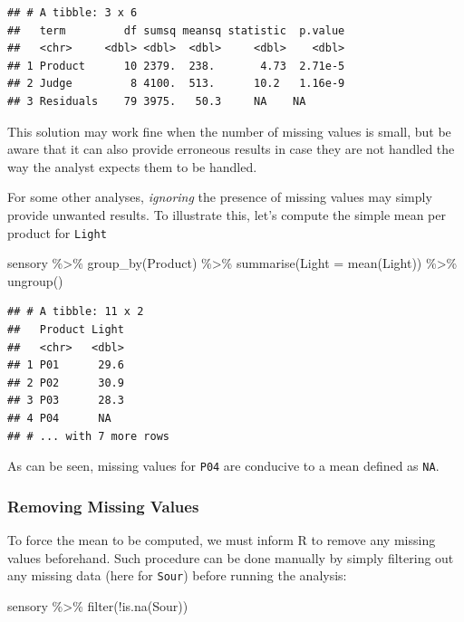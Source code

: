 \documentclass[
]{krantz}
\makeatletter
\newenvironment{Shaded}{\begin{snugshade}}{\end{snugshade}}
\newcommand{\AttributeTok}[1]{\textcolor[rgb]{0.61,0.61,0.61}{#1}}
\newcommand{\FunctionTok}[1]{\textcolor[rgb]{0,0,0}{#1}}
\newcommand{\NormalTok}[1]{#1}
\newcommand{\SpecialCharTok}[1]{\textcolor[rgb]{0,0,0}{#1}}
\newenvironment{kframe}{%
\medskip{}
\setlength{\fboxsep}{.8em}
 \def\at@end@of@kframe{}%
 \ifinner\ifhmode%
  \def\at@end@of@kframe{\end{minipage}}%
  \begin{minipage}{\columnwidth}%
 \fi\fi%
 \def\FrameCommand##1{\hskip\@totalleftmargin \hskip-\fboxsep
 \colorbox{shadecolor}{##1}\hskip-\fboxsep
     \hskip-\linewidth \hskip-\@totalleftmargin \hskip\columnwidth}%
 \MakeFramed {\advance\hsize-\width
   \@totalleftmargin\z@ \linewidth\hsize
   \@setminipage}}%
 {\par\unskip\endMakeFramed%
 \at@end@of@kframe}
\renewenvironment{Shaded}{\begin{kframe}}{\end{kframe}}
\makeatother
\begin{document}
\begin{verbatim}
## # A tibble: 3 x 6
##   term         df sumsq meansq statistic  p.value
##   <chr>     <dbl> <dbl>  <dbl>     <dbl>    <dbl>
## 1 Product      10 2379.  238.       4.73  2.71e-5
## 2 Judge         8 4100.  513.      10.2   1.16e-9
## 3 Residuals    79 3975.   50.3     NA    NA
\end{verbatim}

This solution may work fine when the number of missing values is small, but be aware that it can also provide erroneous results in case they are not handled the way the analyst expects them to be handled.

For some other analyses, \emph{ignoring} the presence of missing values may simply provide unwanted results. To illustrate this, let's compute the simple mean per product for \texttt{Light}

\begin{Shaded}
\begin{Highlighting}[]
\NormalTok{sensory }\SpecialCharTok{\%\textgreater{}\%} 
  \FunctionTok{group\_by}\NormalTok{(Product) }\SpecialCharTok{\%\textgreater{}\%} 
  \FunctionTok{summarise}\NormalTok{(}\AttributeTok{Light =} \FunctionTok{mean}\NormalTok{(Light)) }\SpecialCharTok{\%\textgreater{}\%} 
  \FunctionTok{ungroup}\NormalTok{()}
\end{Highlighting}
\end{Shaded}

\begin{verbatim}
## # A tibble: 11 x 2
##   Product Light
##   <chr>   <dbl>
## 1 P01      29.6
## 2 P02      30.9
## 3 P03      28.3
## 4 P04      NA  
## # ... with 7 more rows
\end{verbatim}

As can be seen, missing values for \texttt{P04} are conducive to a mean defined as \texttt{NA}.

\hypertarget{removing-missing-values}{%
\subsubsection*{Removing Missing Values}\label{removing-missing-values}}


To force the mean to be computed, we must inform R to remove any missing values beforehand. Such procedure can be done manually by simply filtering out any missing data (here for \texttt{Sour}) before running the analysis:

\begin{Shaded}
\begin{Highlighting}[]
\NormalTok{sensory }\SpecialCharTok{\%\textgreater{}\%} 
  \FunctionTok{filter}\NormalTok{(}\SpecialCharTok{!}\FunctionTok{is.na}\NormalTok{(Sour))}
\end{Highlighting}
\end{Shaded}
\end{document}
